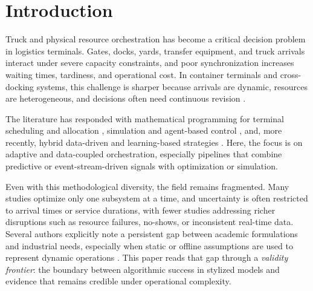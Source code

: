 \documentclass[preprint,12pt,number,longtitle]{elsarticle}
\begin{document}
\section{Introduction}

Truck and physical resource orchestration has become a critical decision problem in logistics terminals. Gates, docks, yards, transfer equipment, and truck arrivals interact under severe capacity constraints, and poor synchronization increases waiting times, tardiness, and operational cost. In container terminals and cross-docking systems, this challenge is sharper because arrivals are dynamic, resources are heterogeneous, and decisions often need continuous revision \cite{nasiri2022,fonseca2024,abbas2018}.

The literature has responded with mathematical programming for terminal scheduling and allocation \cite{cota2022,xu2022,vahdani2019,eti2025}, simulation and agent-based control \cite{dasilva2023,torbali2023}, and, more recently, hybrid data-driven and learning-based strategies \cite{jin2021,luan2025,banyai2025,noh2025,bouyahia2025}. Here, the focus is on adaptive and data-coupled orchestration, especially pipelines that combine predictive or event-stream-driven signals with optimization or simulation.

Even with this methodological diversity, the field remains fragmented. Many studies optimize only one subsystem at a time, and uncertainty is often restricted to arrival times or service durations, with fewer studies addressing richer disruptions such as resource failures, no-shows, or inconsistent real-time data. Several authors explicitly note a persistent gap between academic formulations and industrial needs, especially when static or offline assumptions are used to represent dynamic operations \cite{banyai2025,rostami2022,essghaier2023,cota2022}. This paper reads that gap through a \textit{validity frontier}: the boundary between algorithmic success in stylized models and evidence that remains credible under operational complexity.
\end{document}
